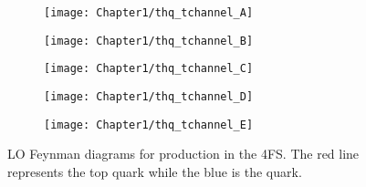 \begin{figure}[h]
\centering
\begin{subfigure}{.31\textwidth}
  \centering
  \texttt{[image: Chapter1/thq\_tchannel\_A]}
  \caption{}
  \label{fig:Chap1:tH:tchannel:4F:A}
\end{subfigure}%
\begin{subfigure}{.31\textwidth}
  \centering
  \texttt{[image: Chapter1/thq\_tchannel\_B]}
  \caption{}
  \label{fig:Chap1:tH:tchannel:4F:B}
\end{subfigure} 
\begin{subfigure}{.31\textwidth}
  \centering
  \texttt{[image: Chapter1/thq\_tchannel\_C]}
  \caption{}
  \label{fig:Chap1:tH:tchannel:4F:C}
\end{subfigure} \quad
\begin{subfigure}{.31\textwidth}
  \centering
  \texttt{[image: Chapter1/thq\_tchannel\_D]}
  \caption{}
  \label{fig:Chap1:tH:tchannel:4F:D}
\end{subfigure} %
\begin{subfigure}{.31\textwidth}
  \centering
  \texttt{[image: Chapter1/thq\_tchannel\_E]}
  \caption{}
  \label{fig:Chap1:tH:tchannel:4F:E}
\end{subfigure}%
\caption{LO Feynman diagrams for \tchannel \tH production in the 4FS. 
The red line represents the top quark while the blue is the \Pbottom quark.}
\label{fig:Chap1:tH:tchannel:4F}
\end{figure}



